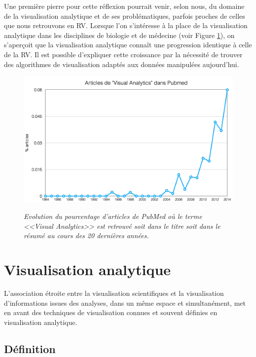 
Une première pierre pour cette réflexion pourrait venir, selon nous, du domaine de la visualisation analytique et de ses problématiques, parfois proches de celles que nous retrouvons en RV.
Lorsque l'on s'intéresse à la place de la visualisation analytique dans les disciplines de biologie et de médecine (voir Figure \ref{Fig:VA_pubmed_trend}), on s'aperçoit que la visualisation analytique connaît une progression identique à celle de la RV. Il est possible d'expliquer cette croissance par la nécessité de trouver des algorithmes de visualisation adaptés aux données manipulées aujourd'hui.

\begin{figure}
  \centering
  {\includegraphics[width=.75\linewidth]{./figures/ch4/VA_pubmed_trend.png}}
    \caption{{\it Evolution du pourcentage d'articles de PubMed où le terme <<Visual Analytics>> est retrouvé soit dans le titre soit dans le résumé au cours des 20 dernières années.}}
  \label{Fig:VA_pubmed_trend}
  \hspace{0.3cm}
\end{figure}


\section{Visualisation analytique}

L'association étroite entre la visualisation scientifiques et la visualisation d'informations issues des analyses, dans un même espace et simultanément, met en avant des techniques de visualisation connues et souvent définies en visualisation analytique.

\subsection{Définition}

